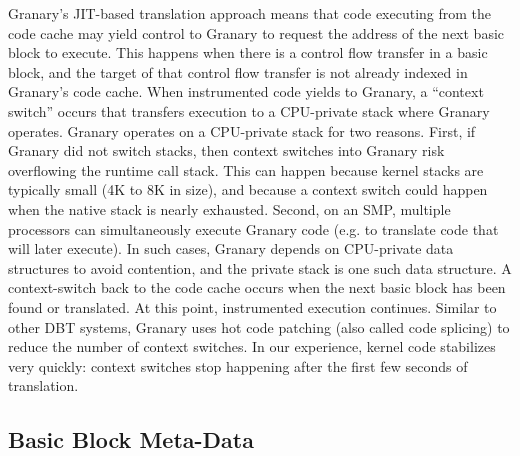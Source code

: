 \documentclass[preprint]{sigplanconf}
\begin{document}
Granary's JIT-based translation approach means that code executing from the code cache may yield control to Granary to request the address of the next basic block to execute. This happens when there is a control flow transfer in a basic block, and the target of that control flow transfer is not already indexed in Granary's code cache. When instrumented code yields to Granary, a ``context switch'' occurs that transfers execution to a CPU-private stack where Granary operates. Granary operates on a CPU-private stack for two reasons. First, if Granary did not switch stacks, then context switches into Granary risk overflowing the runtime call stack. This can happen because kernel stacks are typically small (4K to 8K in size), and because a context switch could happen when the native stack is nearly exhausted. Second, on an SMP, multiple processors can simultaneously execute Granary code (e.g. to translate code that will later execute). In such cases, Granary depends on CPU-private data structures to avoid contention, and the private stack is one such data structure. A context-switch back to the code cache occurs when the next basic block has been found or translated. At this point, instrumented execution continues. Similar to other DBT systems, Granary uses hot code patching (also called code splicing) to reduce the number of context switches. In our experience, kernel code stabilizes very quickly: context switches stop happening after the first few seconds of translation.

\subsection{Basic Block Meta-Data}\label{sec:metadata}
\end{document}
